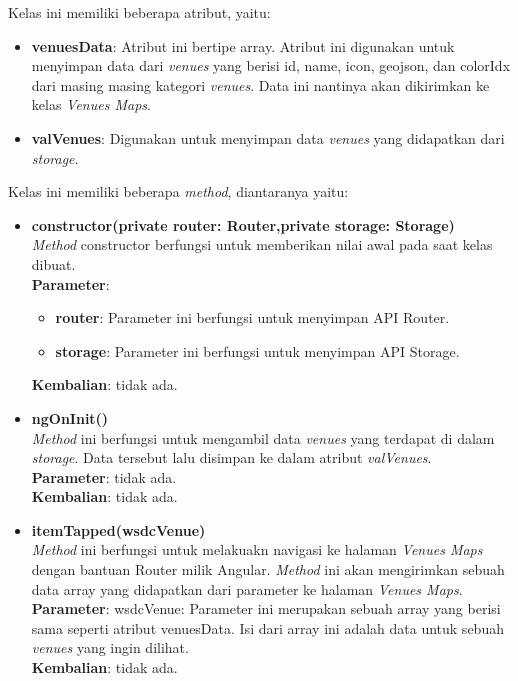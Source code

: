 \begin{enumerate}
				Kelas ini memiliki beberapa atribut, yaitu:
				\begin{itemize}
					\item \textbf{venuesData}: Atribut ini bertipe array. Atribut ini digunakan untuk menyimpan data dari \textit{venues} yang berisi id, name, icon, geojson, dan colorIdx dari masing masing kategori \textit{venues}. Data ini nantinya akan dikirimkan ke kelas \textit{Venues Maps}.
					\item \textbf{valVenues}: Digunakan untuk menyimpan data \textit{venues} yang didapatkan dari \textit{storage}.
				\end{itemize}
				
				Kelas ini memiliki beberapa \textit{method}, diantaranya yaitu:
				\begin{itemize}
					\item \textbf{constructor(private router: Router,private storage: Storage)}\\ 
						\textit{Method} constructor berfungsi untuk memberikan nilai awal pada saat kelas dibuat. \\
						\newpage
						\textbf{Parameter}: 
						\begin{itemize}
							\item \textbf{router}: Parameter ini berfungsi untuk menyimpan API Router.
							\item \textbf{storage}: Parameter ini berfungsi untuk menyimpan API Storage.
						\end{itemize}
						\textbf{Kembalian}: tidak ada.
						
					\item \textbf{ngOnInit()}\\ 
					\textit{Method} ini berfungsi untuk mengambil data \textit{venues} yang terdapat di dalam \textit{storage}. Data tersebut lalu disimpan ke dalam atribut \textit{valVenues}. \\
					\textbf{Parameter}: tidak ada. \\
					\textbf{Kembalian}: tidak ada.
						
					\item \textbf{itemTapped(wsdcVenue)} \\
						\textit{Method} ini berfungsi untuk melakuakn navigasi ke halaman \textit{Venues Maps} dengan bantuan Router milik Angular. \textit{Method} ini akan mengirimkan sebuah data array yang didapatkan dari parameter ke halaman \textit{Venues Maps}. \\
						\textbf{Parameter}: wsdcVenue: Parameter ini merupakan sebuah array yang berisi sama seperti atribut venuesData. Isi dari array ini adalah data untuk sebuah \textit{venues} yang ingin dilihat. \\
						\textbf{Kembalian}: tidak ada.
				\end{itemize}
				

\end{enumerate}

